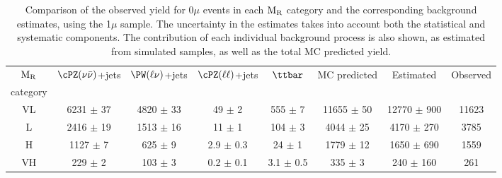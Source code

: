 {{%
\begin{table}[h!]
 \caption{\label{tab:bkg0mu}  Comparison of the observed yield for 
   0$\mu$ events in each $\mathrm{M_{\rm R}}$ category and the
   corresponding background estimates, using the 1$\mu$ sample. The uncertainty in
    the estimates takes into account both the statistical 
    and systematic components. The contribution of each individual background process is also shown, as 
estimated from simulated samples, as well as the total MC predicted yield.}
\small
\centering
 \begin{tabular}{|c|c|c|c|c|c|c|c|}
  \hline
  $\mathrm{M_{\rm R}}$  &  $\cPZ(\nu \bar \nu)$+jets  &  $\PW(
  \ell \nu)$+jets  &  $\cPZ(\ell \ell)$+jets  &  $\ttbar$  & MC predicted&  Estimated  &  Observed \\
category &&&&&& & \\
  \hline
  VL  &  6231  $\pm$ 37  & 4820  $\pm$  33 & 49  $\pm$  2 & 555  $\pm$
  7 & 11655 $\pm$ 50 &12770  $\pm$  900 & 11623 \\
  L  &  2416 $\pm$ 19 & 1513 $\pm$ 16 & 11  $\pm$  1 & 104  $\pm$ 3 & 4044 $\pm$ 25 & 4170   $\pm$  270 & 3785 \\
  H  &  1127 $\pm$  7 & 625 $\pm$  9 & 2.9  $\pm$ 0.3 & 24 $\pm$ 1  &  1779 $\pm$ 12 & 1650  $\pm$  690 & 1559 \\ 
  VH  &  229  $\pm$ 2 & 103 $\pm$  3 & 0.2 $\pm$ 0.1 & 3.1 $\pm$ 0.5 &
   335 $\pm$ 3 & 240  $\pm$  160 & 261\\
  \hline
\end{tabular}
\end{table}

}}
